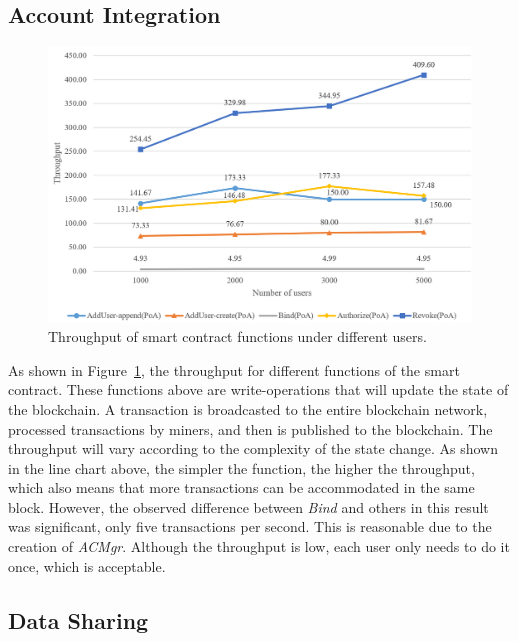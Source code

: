\subsection*{Account Integration}
\begin{figure}[htb]
    \centering
    \includegraphics[height=!,width=1\linewidth,keepaspectratio=true]{figures/smart_contract_tps.png}
    \caption{{\footnotesize Throughput of smart contract functions under different users.}}
    \label{fig:contract_tps}
\end{figure}
As shown in Figure~\ref{fig:contract_tps}, the throughput for different functions of the smart contract. These functions above are write-operations that will update the state of the blockchain. A transaction is broadcasted to the entire blockchain network, processed transactions by miners, and then is published to the blockchain. The throughput will vary according to the complexity of the state change. As shown in the line chart above, the simpler the function, the higher the throughput, which also means that more transactions can be accommodated in the same block. However, the observed difference between \textit{Bind} and others in this result was significant, only five transactions per second. This is reasonable due to the creation of \textit{ACMgr}. Although the throughput is low, each user only needs to do it once, which is acceptable.

\newpage

\subsection*{Data Sharing}



